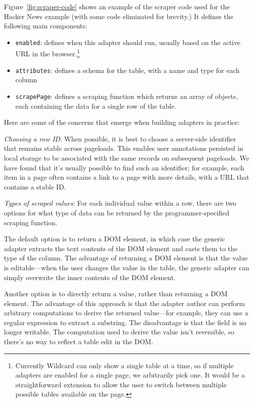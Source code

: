 \documentclass[sigplan,screen,10pt,anonymous,review]{acmart}
\providecommand{\tightlist}{%
  \setlength{\itemsep}{0pt}\setlength{\parskip}{0pt}}
\begin{document}
Figure~\ref{fig:scraper-code} shows an example of the scraper code used
for the Hacker News example (with some code eliminated for brevity.) It
defines the following main components:

\begin{itemize}
\tightlist
\item
  \texttt{enabled}: defines when this adapter should run, usually based
  on the active URL in the browser.\footnote{Currently Wildcard can only
    show a single table at a time, so if multiple adapters are enabled
    for a single page, we arbitrarily pick one. It would be a
    straightforward extension to allow the user to switch between
    multiple possible tables available on the page.}
\item
  \texttt{attributes}: defines a schema for the table, with a name and
  type for each column
\item
  \texttt{scrapePage}: defines a scraping function which returns an
  array of objects, each containing the data for a single row of the
  table.
\end{itemize}

Here are some of the concerns that emerge when building adapters in
practice:

\emph{Choosing a row ID}: When possible, it is best to choose a
server-side identifier that remains stable across pageloads. This
enables user annotations persisted in local storage to be associated
with the same records on subsequent pageloads. We have found that it's
usually possible to find such an identifier; for example, each item in a
page often contains a link to a page with more details, with a URL that
contains a stable ID.

\emph{Types of scraped values}: For each individual value within a row,
there are two options for what type of data can be returned by the
programmer-specified scraping function.

The default option is to return a DOM element, in which case the generic
adapter extracts the text contents of the DOM element and casts them to
the type of the column. The advantage of returning a DOM element is that
the value is editable---when the user changes the value in the table,
the generic adapter can simply overwrite the inner contents of the DOM
element.

Another option is to directly return a value, rather than returning a
DOM element. The advantage of this approach is that the adapter author
can perform arbitrary computations to derive the returned value---for
example, they can use a regular expression to extract a substring. The
disadvantage is that the field is no longer writable. The computation
used to derive the value isn't reversible, so there's no way to reflect
a table edit in the DOM.
\end{document}
